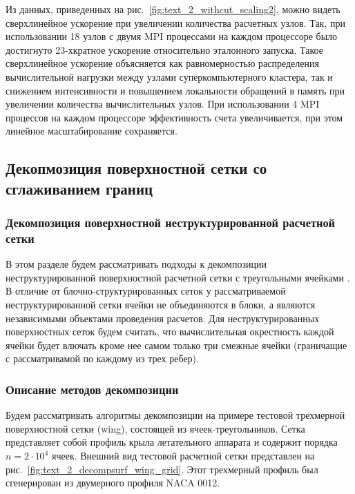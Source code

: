 Из данных, приведенных на рис.~\ref{fig:text_2_withcut_scaling2}, можно видеть сверхлинейное ускорение при увеличении количества расчетных узлов.
Так, при использовании 18 узлов с двумя MPI процессами на каждом процессоре было достигнуто 23-хкратное ускорение относительно эталонного запуска.
Такое сверхлинейное ускорение объясняется как равномерностью распределения вычислительной нагрузки между узлами суперкомпьютерного кластера, так и снижением интенсивности и повышением локальности обращений в память при увеличении количества вычислительных узлов.
При использовании 4 MPI процессов на каждом процессоре эффективность счета увеличивается, при этом линейное масштабирование сохраняется.


\subsection{Декопмозиция поверхностной сетки со сглаживанием границ}

\subsubsection{Декомпозиция поверхностной неструктурированной расчетной сетки}

В этом разделе будем рассматривать подходы к декомпозиции неструктурированной поверхностной расчетной сетки с треугольными ячейками\label{term:unstruct_surf_calc_mesh3} \cite{Rybakov2020Decomp}.
В отличие от блочно-структурированных сеток\label{term:mesh_block_struct4} у рассматриваемой неструктурированной сетки ячейки не объединяются в блоки, а являются независимыми объектами проведения расчетов.
Для неструктурированных поверхностных сеток будем считать, что вычислительная окрестность\label{term:cell_calc_template2} каждой ячейки будет влючать кроме нее самом только три смежные ячейки (граничащие с рассматривамой по каждому из трех ребер).

\subsubsection{Описание методов декомпозиции}

Будем рассматривать алгоритмы декомпозиции на примере тестовой трехмерной поверхностной сетки (wing), состоящей из ячеек-треугольников.
Сетка представляет собой профиль крыла летательного аппарата и содержит порядка $n = 2 \cdot 10^4$ ячеек.
Внешний вид тестовой расчетной сетки представлен на рис.~\ref{fig:text_2_decompsurf_wing_grid}.
Этот трехмерный профиль был сгенерирован из двумерного профиля NACA 0012.

